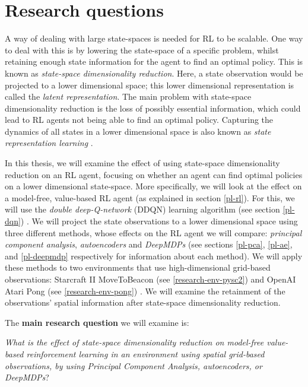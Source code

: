 \section{Research questions}
A way of dealing with large state-spaces is needed for RL to be scalable. One way to deal with this is by lowering the state-space of a specific problem, whilst retaining enough state information for the agent to find an optimal policy. This is known as \emph{state-space dimensionality reduction}. Here, a state observation would be projected to a lower dimensional space; this lower dimensional representation is called the \emph{latent representation}. The main problem with state-space dimensionality reduction is the loss of possibly essential information, which could lead to RL agents not being able to find an optimal policy. Capturing the dynamics of all states in a lower dimensional space is also known as \emph{state representation learning} \cite{representation_overview}.

In this thesis, we will examine the effect of using state-space dimensionality reduction on an RL agent, focusing on whether an agent can find optimal policies on a lower dimensional state-space. More specifically, we will look at the effect on a model-free, value-based RL agent (as explained in section \ref{pl-rl}). For this, we will use the \emph{double deep-Q-network} (DDQN) learning algorithm (see section \ref{pl-dqn}) \cite{ddqn}. We will project the state observations to a lower dimensional space using three different methods, whose effects on the RL agent we will compare: \emph{principal component analysis}, \emph{autoencoders} and \emph{DeepMDPs} (see sections \ref{pl-pca}, \ref{pl-ae}, and \ref{pl-deepmdp} respectively for information about each method). We will apply these methods to two environments that use high-dimensional grid-based observations: Starcraft II MoveToBeacon (see \ref{research-env-pysc2}) and OpenAI Atari Pong (see \ref{research-env-pong}) \cite{pysc2}\cite{pong}. We will examine the retainment of the observations' spatial information after state-space dimensionality reduction.

The \textbf{main research question} we will examine is:\newline

\noindent \textit{What is the effect of state-space dimensionality reduction on model-free value-based reinforcement learning in an environment using spatial grid-based observations, by using Principal Component Analysis, autoencoders, or DeepMDPs}? \newline

